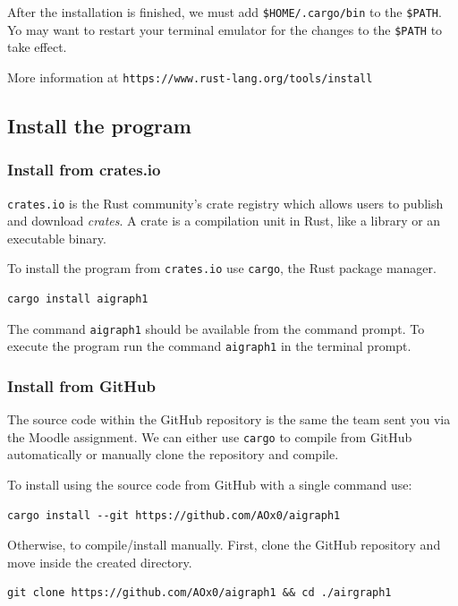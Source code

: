 After the installation is finished, we must add \texttt{\$HOME/.cargo/bin} to the \texttt{\$PATH}.
Yo may want to restart your terminal emulator for the changes to the \texttt{\$PATH} to take effect.

More information at \texttt{https://www.rust-lang.org/tools/install}

\subsection{Install the program}

\subsubsection{Install from crates.io}

\texttt{crates.io} is the Rust community’s crate registry which allows users to publish and download \textit{crates}.
A crate is a compilation unit in Rust, like a library or an executable binary.

To install the program from \texttt{crates.io} use \texttt{cargo}, the Rust package manager.

\begin{verbatim}
cargo install aigraph1
\end{verbatim}

The command \texttt{aigraph1} should be available from the command prompt.
To execute the program run the command \texttt{aigraph1} in the terminal prompt.

\subsubsection{Install from GitHub}

The source code within the GitHub repository is the same the team sent you via the Moodle assignment.
We can either use \texttt{cargo} to compile from GitHub automatically or manually clone the repository and
compile.

To install using the source code from GitHub with a single command use:
\begin{verbatim}
cargo install --git https://github.com/AOx0/aigraph1
\end{verbatim}

Otherwise, to compile/install manually. First, clone the GitHub repository and move inside the created directory.

\begin{verbatim}
git clone https://github.com/AOx0/aigraph1 && cd ./airgraph1
\end{verbatim}

